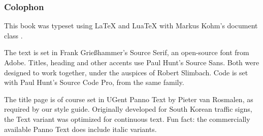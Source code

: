 \documentclass[main]{subfiles}
\begin{document}
\vspace*{\fill}

\begin{small}
    \subsubsection*{Colophon}

    This book was typeset using {\LaTeX} and {Lua\TeX} with Markus Kohm's document class {\KOMAScript}.

    The text is set in Frank Grießhammer's Source Serif, an open-source font from Adobe.
    Titles, heading and other accents use Paul Hunt's {\sffamily Source Sans}.
    Both were designed to work together, under the auspices of Robert Slimbach.
    Code is set with Paul Hunt's {\ttfamily Source Code Pro}, from the same family.

    The title page is of course set in {\panno\selectfont UGent Panno Text} by Pieter van Rosmalen, as required by our style guide.
    Originally developed for South Korean traffic signs, the Text variant was optimized for continuous text.
    Fun fact: the commercially available Panno Text does include italic variants.
\end{small}
\end{document}
